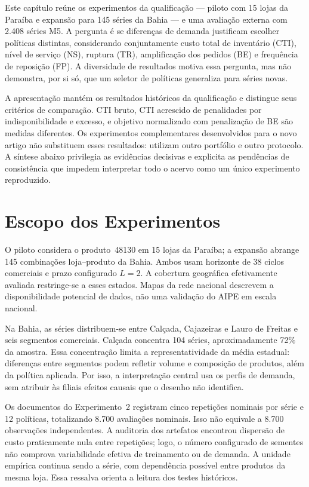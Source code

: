 
Este capítulo reúne os experimentos da qualificação — piloto com 15 lojas da Paraíba e expansão para 145 séries da Bahia — e uma avaliação externa com 2.408 séries M5. A pergunta é se diferenças de demanda justificam escolher políticas distintas, considerando conjuntamente custo total de inventário (CTI), nível de serviço (NS), ruptura (TR), amplificação dos pedidos (BE) e frequência de reposição (FP). A diversidade de resultados motiva essa pergunta, mas não demonstra, por si só, que um seletor de políticas generaliza para séries novas.

A apresentação mantém os resultados históricos da qualificação e distingue seus critérios de comparação. CTI bruto, CTI acrescido de penalidades por indisponibilidade e excesso, e objetivo normalizado com penalização de BE são medidas diferentes. Os experimentos complementares desenvolvidos para o novo artigo não substituem esses resultados: utilizam outro portfólio e outro protocolo. A síntese abaixo privilegia as evidências decisivas e explicita as pendências de consistência que impedem interpretar todo o acervo como um único experimento reproduzido.

\section{Escopo dos Experimentos}

O piloto considera o produto~48130 em 15 lojas da Paraíba; a expansão abrange 145 combinações loja--produto da Bahia. Ambos usam horizonte de 38 ciclos comerciais e prazo configurado $L=2$. A cobertura geográfica efetivamente avaliada restringe-se a esses estados. Mapas da rede nacional descrevem a disponibilidade potencial de dados, não uma validação do AIPE em escala nacional.

Na Bahia, as séries distribuem-se entre Calçada, Cajazeiras e Lauro de Freitas e seis segmentos comerciais. Calçada concentra 104 séries, aproximadamente 72\% da amostra. Essa concentração limita a representatividade da média estadual: diferenças entre segmentos podem refletir volume e composição de produtos, além da política aplicada. Por isso, a interpretação central usa os perfis de demanda, sem atribuir às filiais efeitos causais que o desenho não identifica.

Os documentos do Experimento~2 registram cinco repetições nominais por série e 12 políticas, totalizando 8.700 avaliações nominais. Isso não equivale a 8.700 observações independentes. A auditoria dos artefatos encontrou dispersão de custo praticamente nula entre repetições; logo, o número configurado de sementes não comprova variabilidade efetiva de treinamento ou de demanda. A unidade empírica continua sendo a série, com dependência possível entre produtos da mesma loja. Essa ressalva orienta a leitura dos testes históricos.


